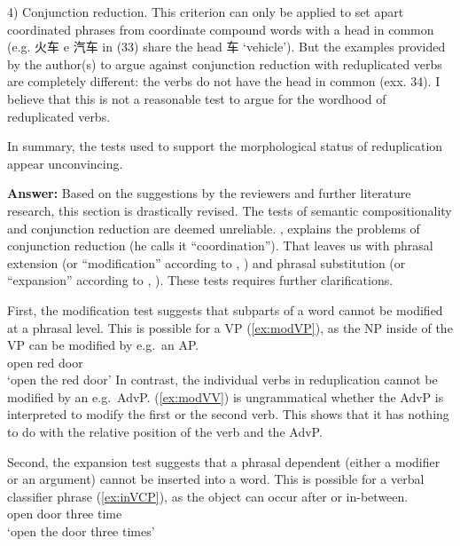 \documentclass[fleqn,twoside]{article}
\begin{document}
\begin{enumerate}
4) Conjunction reduction. This criterion can only be applied to set apart coordinated phrases from coordinate compound words with a head in common (e.g. 火车  e 汽车  in (33) share the head  车  `vehicle'). But the examples provided by the author(s) to argue against conjunction reduction with reduplicated verbs are completely different: the verbs do not have the head in common (exx. 34). I believe that this is not a reasonable test to argue for the wordhood of reduplicated verbs.

In summary, the tests used to support the morphological status of reduplication appear
unconvincing.


\textbf{Answer:}\label{morph}
Based on the suggestions by the reviewers and further literature research, this section is drastically revised.
The tests of semantic compositionality and conjunction reduction are deemed unreliable.
\citet[37--38]{Dai1992}, \citeyear[120--122]{Dai1998} explains the problems of conjunction reduction (he calls it ``coordination'').
That leaves us with phrasal extension (or ``modification'' according to \citealt[32]{Dai1992}, \citeyear[117]{Dai1998})
and phrasal substitution (or ``expansion'' according to \citealt[33]{Dai1992}, \citeyear[117--120]{Dai1998}).
These tests requires further clarifications.

First, the modification test suggests that subparts of a word cannot be modified at a phrasal level.
This is possible for a VP (\ref{ex:modVP}), as the NP inside of the VP can be modified by e.g.\ an AP.
\ea\label{ex:modVP} %
\gll {}  \\
open  red door\\
\glt `open the red door'
\z
In contrast, the individual verbs in reduplication cannot be modified by an e.g.\ AdvP.
(\ref{ex:modVV}) is ungrammatical whether the AdvP is interpreted to modify the first or the second verb.
This shows that it has nothing to do with the relative position of the verb and the AdvP.
\z


Second, the expansion test suggests that a phrasal dependent (either a modifier or an argument) cannot be inserted into a word.
This is possible for a verbal classifier phrase (\ref{ex:inVCP}), as the object can occur after or in-between.
\ea\label{ex:inVCP}%
\ea \gll {}   \\
open door three time\\
\glt `open the door three times'


\end{enumerate}
\end{document}
